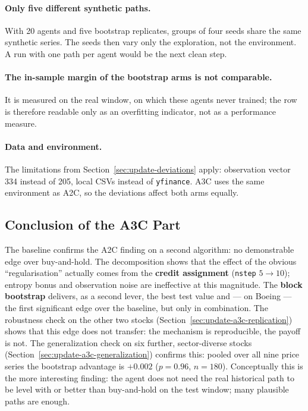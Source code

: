 \paragraph{Only five different synthetic paths.} With 20 agents and five bootstrap
replicates, groups of four seeds share the same synthetic series. The seeds then vary only
the exploration, not the environment. A run with one path per agent would be the next clean
step.

\paragraph{The in-sample margin of the bootstrap arms is not comparable.} It is measured on
the real window, on which these agents never trained; the row is therefore readable only as
an overfitting indicator, not as a performance measure.

\paragraph{Data and environment.} The limitations from Section~\ref{sec:update-deviations}
apply: observation vector 334 instead of 205, local CSVs instead of \texttt{yfinance}. A3C
uses the same environment as A2C, so the deviations affect both arms equally.

\subsection{Conclusion of the A3C Part}

The baseline confirms the A2C finding on a second algorithm: no demonstrable edge over
buy-and-hold. The decomposition shows that the effect of the obvious ``regularisation''
actually comes from the \textbf{credit assignment} (\texttt{nstep} $5\to10$); entropy bonus
and observation noise are ineffective at this magnitude. The \textbf{block bootstrap}
delivers, as a second lever, the best test value and --- on Boeing --- the first significant
edge over the baseline, but only in combination. The robustness check on the other two
stocks (Section~\ref{sec:update-a3c-replication}) shows that this edge does not transfer:
the mechanism is reproducible, the payoff is not. The generalization check on six further,
sector-diverse stocks (Section~\ref{sec:update-a3c-generalization}) confirms this: pooled
over all nine price series the bootstrap advantage is $+0.002$ ($p=0.96$, $n=180$).
Conceptually this is the more interesting finding: the
agent does not need the real historical path to be level with or better than buy-and-hold on
the test window; many plausible paths are enough.
